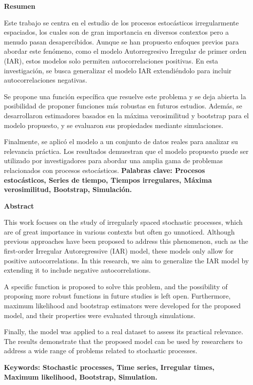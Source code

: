 \vspace*{1cm}

\textbf{\LARGE Resumen}\vspace*{1cm}

Este trabajo se centra en el estudio de los procesos estocásticos irregularmente espaciados, los cuales son de gran importancia en diversos contextos pero a menudo pasan desapercibidos. Aunque se han propuesto enfoques previos para abordar este fenómeno, como el modelo Autorregresivo Irregular de primer orden (IAR), estos modelos solo permiten autocorrelaciones positivas. En esta investigación, se busca generalizar el modelo IAR extendiéndolo para incluir autocorrelaciones negativas.

Se propone una función específica que resuelve este problema y se deja abierta la posibilidad de proponer funciones más robustas en futuros estudios. Además, se desarrollaron estimadores basados en la máxima verosimilitud y bootstrap para el modelo propuesto, y se evaluaron sus propiedades mediante simulaciones.

Finalmente, se aplicó el modelo a un conjunto de datos reales para analizar su relevancia práctica. Los resultados demuestran que el modelo propuesto puede ser utilizado por investigadores para abordar una amplia gama de problemas relacionados con procesos estocásticos.
\textbf{\small Palabras clave: Procesos estocásticos, Series de tiempo, Tiempos irregulares, Máxima verosimilitud, Bootstrap, Simulación.}\vspace*{1cm}

\textbf{\LARGE Abstract}\vspace*{1cm}


This work focuses on the study of irregularly spaced stochastic processes, which are of great importance in various contexts but often go unnoticed. Although previous approaches have been proposed to address this phenomenon, such as the first-order Irregular Autoregressive (IAR) model, these models only allow for positive autocorrelations. In this research, we aim to generalize the IAR model by extending it to include negative autocorrelations.

A specific function is proposed to solve this problem, and the possibility of proposing more robust functions in future studies is left open. Furthermore, maximum likelihood and bootstrap estimators were developed for the proposed model, and their properties were evaluated through simulations.

Finally, the model was applied to a real dataset to assess its practical relevance. The results demonstrate that the proposed model can be used by researchers to address a wide range of problems related to stochastic processes.

\textbf{\small Keywords: Stochastic processes, Time series, Irregular times, Maximum likelihood, Bootstrap, Simulation.}

\newpage{\pagestyle{empty}\cleardoublepage}